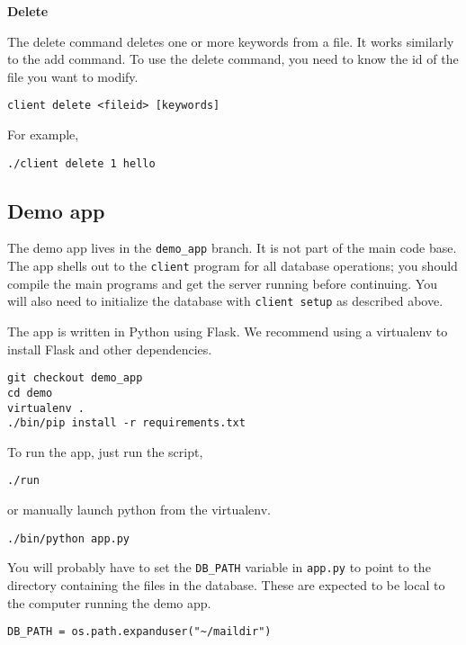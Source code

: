 \noindent\textbf{Delete}

The delete command deletes one or more keywords from a file.
It works similarly to the add command.
To use the delete command, you need to know the id of the file you want to modify.

\begin{lstlisting}
client delete <fileid> [keywords]
\end{lstlisting}

For example,

\begin{lstlisting}
./client delete 1 hello
\end{lstlisting}

\subsection{Demo app}

The demo app lives in the \texttt{demo\_app} branch.
It is not part of the main code base.
The app shells out to the \texttt{client} program for all database operations;
you should compile the main programs and get the server running before continuing.
You will also need to initialize the database with \texttt{client setup} as described above.

The app is written in Python using Flask.
We recommend using a virtualenv to install Flask and other dependencies.

\begin{lstlisting}
git checkout demo_app
cd demo
virtualenv .
./bin/pip install -r requirements.txt
\end{lstlisting}

To run the app, just run the script,

\begin{lstlisting}
./run
\end{lstlisting}

or manually launch python from the virtualenv.

\begin{lstlisting}
./bin/python app.py
\end{lstlisting}

You will probably have to set the \texttt{DB\_PATH} variable in \texttt{app.py}
to point to the directory containing the files in the database.
These are expected to be local to the computer running the demo app.

\begin{lstlisting}
DB_PATH = os.path.expanduser("~/maildir")
\end{lstlisting}

